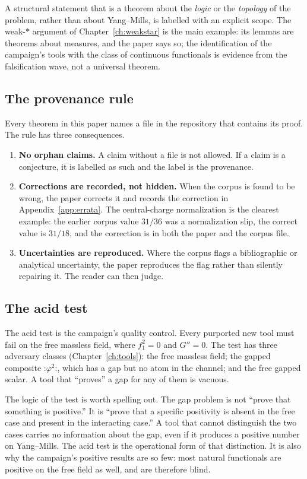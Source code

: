 A structural statement that is a theorem about the \emph{logic} or the \emph{topology} of the
problem, rather than about Yang--Mills, is labelled \LT{} with an explicit scope. The weak-$*$
argument of Chapter~\ref{ch:weakstar} is the main example: its lemmas are theorems about
measures, and the paper says so; the identification of the campaign's tools with the class of
continuous functionals is evidence from the falsification wave, not a universal theorem.

\subsection{The provenance rule}

Every theorem in this paper names a file in the repository that contains its proof. The rule has
three consequences.
\begin{enumerate}
\item \textbf{No orphan claims.} A claim without a file is not allowed. If a claim is a
  conjecture, it is labelled as such and the label is the provenance.
\item \textbf{Corrections are recorded, not hidden.} When the corpus is found to be wrong, the
  paper corrects it and records the correction in Appendix~\ref{app:errata}. The central-charge
  normalization is the clearest example: the earlier corpus value $31/36$ was a normalization
  slip, the correct value is $31/18$, and the correction is in both the paper and the corpus
  file.
\item \textbf{Uncertainties are reproduced.} Where the corpus flags a bibliographic or
  analytical uncertainty, the paper reproduces the flag rather than silently repairing it. The
  reader can then judge.
\end{enumerate}

\subsection{The acid test}

The acid test is the campaign's quality control. Every purported new tool must fail on the
free massless field, where $f_1^2=0$ and $G''=0$. The test has three adversary classes
(Chapter~\ref{ch:tools}): the free massless field; the gapped composite
$\mathord{:}\varphi^2\mathord{:}$, which has a gap but no atom in the channel; and the free
gapped scalar. A tool that ``proves'' a gap for any of them is vacuous.

The logic of the test is worth spelling out. The gap problem is not ``prove that something is
positive.'' It is ``prove that a specific positivity is absent in the free case and present in
the interacting case.'' A tool that cannot distinguish the two cases carries no information about
the gap, even if it produces a positive number on Yang--Mills. The acid test is the operational
form of that distinction. It is also why the campaign's positive results are so few: most natural
functionals are positive on the free field as well, and are therefore blind.


